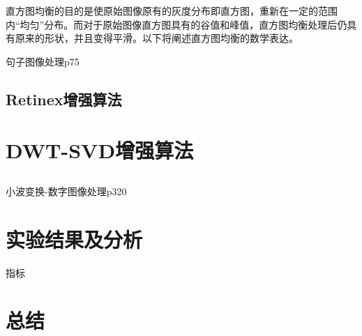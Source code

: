 \documentclass[12pt]{book}
\begin{document}
直方图均衡的目的是使原始图像原有的灰度分布即直方图，重新在一定的范围内“均匀”分布。而对于原始图像直方图具有的谷值和峰值，直方图均衡处理后仍具有原来的形状，并且变得平滑。以下将阐述直方图均衡的数学表达。

句子图像处理p75
		\section{Retinex增强算法}	
	\chapter{DWT-SVD增强算法}
		\section{}
		小波变换-数字图像处理p320
	\chapter{实验结果及分析}指标

	\chapter{总结}
\end{document}
